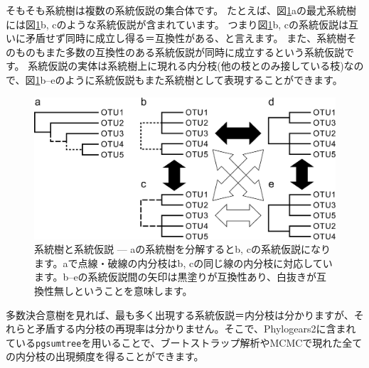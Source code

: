 \documentclass[titlepage,10pt,a4paper]{jsbook}
\begin{document}
そもそも系統樹は複数の系統仮説の集合体です。
たとえば、図\ref{figure:tree_hypotheses}aの最尤系統樹には図\ref{figure:tree_hypotheses}b, cのような系統仮説が含まれています。
つまり図\ref{figure:tree_hypotheses}b, cの系統仮説は互いに矛盾せず同時に成立し得る＝互換性がある、と言えます。
また、系統樹そのものもまた多数の互換性のある系統仮説が同時に成立するという系統仮説です。
系統仮説の実体は系統樹上に現れる内分枝(他の枝とのみ接している枝)なので、図\ref{figure:tree_hypotheses}b--eのように系統仮説もまた系統樹として表現することができます。
\begin{figure}[h]
\begin{center}
\caption{系統樹と系統仮説 --- aの系統樹を分解するとb, cの系統仮説になります。aで点線・破線の内分枝はb, cの同じ線の内分枝に対応しています。b--eの系統仮説間の矢印は黒塗りが互換性あり、白抜きが互換性無しということを意味します。}\label{figure:tree_hypotheses}
\includegraphics[width=\linewidth,keepaspectratio]{tree_hypotheses.eps}
\end{center}
\end{figure}

多数決合意樹を見れば、最も多く出現する系統仮説＝内分枝は分かりますが、それらと矛盾する内分枝の再現率は分かりません。そこで、Phylogears2に含まれている\texttt{pgsumtree}を用いることで、ブートストラップ解析やMCMCで現れた全ての内分枝の出現頻度を得ることができます。
\end{document}
